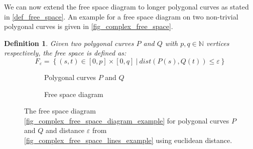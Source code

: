 \documentclass[
oneside,
fontsize=11pt
]{scrartcl}
\newtheorem{mydef}{Definition}
\begin{document}
We can now extend the free space diagram to longer polygonal curves 
as stated in \autoref{def_free_space}.
An example for a free space diagram on two non-trivial polygonal curves is given in \autoref{fig_complex_free_space}.

\begin{mydef}
  \label{def_free_space}
  Given two polygonal curves $P$ and $Q$ with $p,q \in \mathbb{N}$ vertices respectively, 
  the free space is defined as:
  $$F_\varepsilon = \left\{ (s,t) \in [0,p] \times [0,q] \ | \ dist(P(s), Q(t)) \leq \varepsilon \right\}$$
\end{mydef}

\begin{figure}[ht]
  \centering
  \begin{subfigure}[b]{0.45\textwidth}
      \caption{Polygonal curves $P$ and $Q$}
      \label{fig_complex_free_space_lines_example}
  \end{subfigure}
  \hfill
  \begin{subfigure}[b]{0.45\textwidth}
      \caption{Free space diagram}
      \label{fig_complex_free_space_diagram_example}
  \end{subfigure}
  \caption[Complex free space diagram example]{
    The free space diagram \autoref{fig_complex_free_space_diagram_example} 
    for polygonal curves $P$ and $Q$ and distance $\varepsilon$ 
    from \autoref{fig_complex_free_space_lines_example} using euclidean distance.}
  \label{fig_complex_free_space}
\end{figure}
\end{document}
